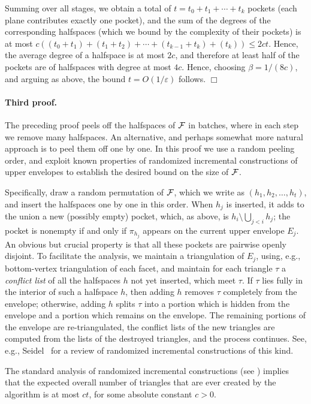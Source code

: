 \documentclass[12pt]{article}
\newcommand{\eps}{{\varepsilon}}
\def\F{{\cal F}}
\begin{document}
Summing over all stages, we obtain a total of $t=t_0+t_1+\cdots+t_k$
pockets (each plane contributes exactly one pocket), and the sum of
the degrees of the corresponding halfspaces (which we bound by the
complexity of their pockets) is at most
$c((t_0+t_1)+(t_1+t_2)+\cdots+(t_{k-1}+t_k)+(t_k))\le 2ct$.
Hence, the average degree of a halfspace is at most $2c$,
and therefore at least half of the pockets are of halfspaces with
degree at most $4c$. Hence, choosing $\beta=1/(8c)$, and arguing
as above, the bound $t=O(1/\eps)$ follows.
$\Box$

\paragraph{Third proof.}
The preceding proof peels off the halfspaces of $\F$ in batches, where
in each step we remove many halfspaces. An alternative, and perhaps
somewhat more natural approach is to peel them off one by one.
In this proof we use a random peeling order, and exploit known properties
of randomized incremental constructions of upper envelopes to
establish the desired bound on the size of $\F$.

Specifically, draw a random permutation of $\F$, which we write as
$(h_1,h_2,\ldots,h_t)$, and insert the halfspaces one by one in this
order.  When $h_j$ is inserted, it adds to the union a new (possibly
empty) pocket, which, as above, is $h_i\setminus\bigcup_{j<i} h_j$;
the pocket is nonempty if and only if $\pi_{h_j}$ appears on the
current upper envelope $E_j$. An obvious but crucial property is that
all these pockets are pairwise openly disjoint.  To facilitate the
analysis, we maintain a triangulation of $E_j$, using, e.g., bottom-vertex
triangulation of each facet, and maintain for each triangle $\tau$ a
{\em conflict list} of all the halfspaces $h$ not yet inserted, which
meet $\tau$. If $\tau$ lies fully in the interior of such a halfspace
$h$, then adding $h$ removes $\tau$ completely from the envelope;
otherwise, adding $h$ splits $\tau$ into a portion which is hidden
from the envelope and a portion which remains on the envelope.  The
remaining portions of the envelope are re-triangulated, the conflict
lists of the new triangles are computed from the lists of the
destroyed triangles, and the process continues. See, e.g.,
Seidel~\cite{s-barga-93} for a review of randomized incremental
constructions of this kind.

The standard analysis of randomized incremental constructions (see
\cite{s-barga-93}) implies that the expected overall number of
triangles that are ever created by the algorithm is at most $ct$, for
some absolute constant $c>0$.
\end{document}
